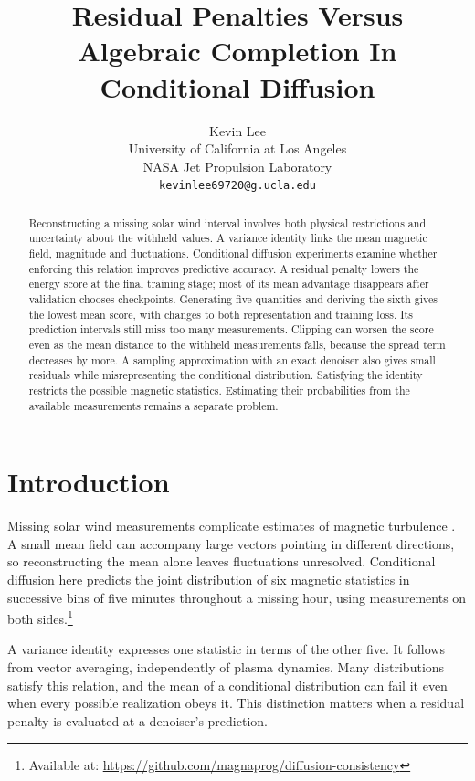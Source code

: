 \documentclass{article}
\title{Residual Penalties Versus Algebraic Completion In Conditional Diffusion}
\author{%
 Kevin Lee{\hypersetup{hidelinks}\orcidlink{0009-0004-0388-9260}} \\
 [4pt]
 University of California at Los Angeles \\
 NASA Jet Propulsion Laboratory \\
 [2pt]
 \texttt{kevinlee69720@g.ucla.edu}
}
\begin{document}
\maketitle

\begin{abstract}
Reconstructing a missing solar wind interval involves both physical restrictions and uncertainty about the withheld values. A variance identity links the mean magnetic field, magnitude and fluctuations. Conditional diffusion experiments examine whether enforcing this relation improves predictive accuracy. A residual penalty lowers the energy score at the final training stage; most of its mean advantage disappears after validation chooses checkpoints. Generating five quantities and deriving the sixth gives the lowest mean score, with changes to both representation and training loss. Its prediction intervals still miss too many measurements. Clipping can worsen the score even as the mean distance to the withheld measurements falls, because the spread term decreases by more. A sampling approximation with an exact denoiser also gives small residuals while misrepresenting the conditional distribution. Satisfying the identity restricts the possible magnetic statistics. Estimating their probabilities from the available measurements remains a separate problem.
\end{abstract}

\section{Introduction}

Missing solar wind measurements complicate estimates of magnetic turbulence \citep{wrench2022statistics}. A small mean field can accompany large vectors pointing in different directions, so reconstructing the mean alone leaves fluctuations unresolved. Conditional diffusion here predicts the joint distribution of six magnetic statistics in successive bins of five minutes throughout a missing hour, using measurements on both sides.\footnote{Available at: \url{https://github.com/magnaprog/diffusion-consistency}}

A variance identity expresses one statistic in terms of the other five. It follows from vector averaging, independently of plasma dynamics. Many distributions satisfy this relation, and the mean of a conditional distribution can fail it even when every possible realization obeys it. This distinction matters when a residual penalty is evaluated at a denoiser's prediction.
\end{document}
